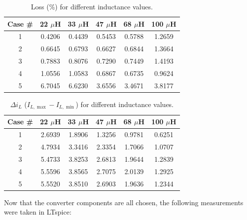         \begin{table}[!ht]
            \caption{Loss (\%) for different inductance values.}
            \centering
            \begin{tabular}{|c|ccccc|}
            \hline
            \textbf{Case \#} & \textbf{22 $\mu$H} & \textbf{33 $\mu$H} & \textbf{47 $\mu$H} & \textbf{68 $\mu$H} & \textbf{100 $\mu$H} \\
            \hline
            1 & 0.4206 & 0.4439 & 0.5453 & 0.5788 & 1.2659 \\
            2 & 0.6645 & 0.6793 & 0.6627 & 0.6844 & 1.3664 \\
            3 & 0.7883 & 0.8076 & 0.7290 & 0.7449 & 1.4193 \\
            4 & 1.0556 & 1.0583 & 0.6867 & 0.6735 & 0.9624 \\
            5 & 6.7045 & 6.6230 & 3.6556 & 3.4671 & 3.8177 \\
            \hline
            \end{tabular}
            \label{tab:loss_inductance_2}
        \end{table}


        \begin{table}[!ht]
            \caption{$\Delta i_{L}$ ($I_{L,\max} - I_{L,\min}$) for different inductance values.}
            \centering
            \begin{tabular}{|c|ccccc|}
            \hline
            \textbf{Case \#} & \textbf{22 $\mu$H} & \textbf{33 $\mu$H} & \textbf{47 $\mu$H} & \textbf{68 $\mu$H} & \textbf{100 $\mu$H} \\
            \hline
            1 & 2.6939 & 1.8906 & 1.3256 & 0.9781 & 0.6251 \\
            2 & 4.7934 & 3.3416 & 2.3354 & 1.7066 & 1.0707 \\
            3 & 5.4733 & 3.8253 & 2.6813 & 1.9644 & 1.2839 \\
            4 & 5.5596 & 3.8565 & 2.7075 & 2.0139 & 1.2925 \\
            5 & 5.5520 & 3.8510 & 2.6903 & 1.9636 & 1.2344 \\
            \hline
            \end{tabular}
            \label{tab:delta_iin_inductance}
        \end{table}

        Now that the converter components are all chosen, the following measurements were taken in LTspice:

